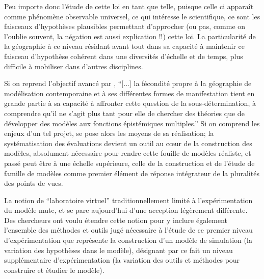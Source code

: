 Peu importe donc l'étude de cette loi en tant que telle, puisque celle ci apparaît comme phénomène observable universel, ce qui intéresse le scientifique, ce sont les faisceaux d'hypothèses plausibles permettant d'approcher (ou pas, comme on l'oublie souvent, la négation est aussi explication !!) cette loi. La particularité de la géographie à ce niveau résidant avant tout dans sa capacité à maintenir ce faisceau d'hypothèse cohérent dans une diversités d'échelle et de temps, plus difficile à mobiliser dans d'autres disciplines.

Si on reprend l'objectif avancé par \autocite{Varenne2014}, \enquote{[...] la fécondité propre à la géographie de modélisation contemporaine et à ses différentes formes de manifestation tient en grande partie à sa capacité à affronter cette question de la sous-détermination, à comprendre qu’il ne s’agit plus tant pour elle de chercher des théories que de développer des modèles aux fonctions épistémiques multiples.} Si on comprend les enjeux d'un tel projet, se pose alors les moyens de sa réalisation; la systématisation des évaluations devient un outil au cœur de la construction des modèles, absolument nécessaire pour rendre cette fouille de modèles réaliste, et passé peut être à une échelle supérieure, celle de la construction et de l'étude de famille de modèles comme premier élément de réponse intégrateur de la pluralités des points de vues.

La notion de \enquote{laboratoire virtuel} traditionnellement limité à l'expérimentation du modèle mute, et se pare aujourd'hui d'une acception légèrement différente. Des chercheurs \autocite{Schmitt2014} \autocite{Amblard2003} ont voulu étendre cette notion pour y inclure également l'ensemble des méthodes et outils jugé nécessaire à l'étude de ce premier niveau d'expérimentation que représente la construction d'un modèle de simulation (la variation des hypothèses dans le modèle), désignant par ce fait un niveau supplémentaire d’expérimentation (la variation des outils et méthodes pour construire et étudier le modèle).



